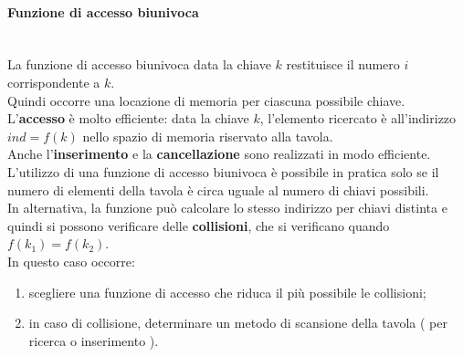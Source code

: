 \documentclass[12pt]{report}
\begin{document}
	\paragraph{Funzione di accesso biunivoca} \quad \\
	La funzione di accesso biunivoca data la chiave $k$ restituisce il numero $i$ corrispondente a $k$. \\
	Quindi occorre una locazione di memoria per ciascuna possibile chiave. \\
	L'\textbf{accesso} è molto efficiente: data la chiave $k$, l'elemento ricercato è all'indirizzo $ind=f(k)$ nello spazio di memoria riservato alla tavola. \\
	Anche l'\textbf{inserimento} e la \textbf{cancellazione} sono realizzati in modo efficiente. \\
	L'utilizzo di una funzione di accesso biunivoca è possibile in pratica solo se il numero di elementi della tavola è circa uguale al numero di chiavi possibili. \\
	In alternativa, la funzione può calcolare lo stesso indirizzo per chiavi distinta e quindi si possono verificare delle \textbf{collisioni}, che si verificano quando $f(k_1) = f(k_2)$. \\
	In questo caso occorre:
	\begin{enumerate}
		\item scegliere una funzione di accesso che riduca il più possibile le collisioni;
		\item in caso di collisione, determinare un metodo di scansione della tavola ( per ricerca o inserimento ).
	\end{enumerate}
\end{document}
